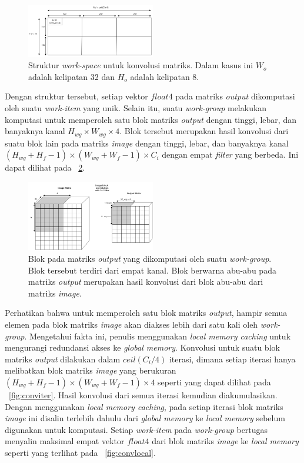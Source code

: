 \begin{figure}
	\centering
	\includegraphics[width=0.50\textwidth]
	{pics/wiconv.png}
	\caption{Struktur \textit{work-space} untuk konvolusi matriks. Dalam kasus ini $W_o$ adalah kelipatan 32 dan $H_o$ adalah kelipatan 8.}
	\label{fig:wiconv}
\end{figure}

Dengan struktur tersebut, setiap vektor $float4$ pada matriks \textit{output} dikomputasi oleh suatu \textit{work-item} yang unik. Selain itu, suatu \textit{work-group} melakukan komputasi untuk memperoleh satu blok matriks \textit{output} dengan tinggi, lebar, dan banyaknya kanal $H_{wg} \times W_{wg} \times 4$. Blok tersebut merupakan hasil konvolusi dari suatu blok lain pada matriks \textit{image} dengan tinggi, lebar, dan banyaknya kanal $(H_{wg}+H_f-1) \times (W_{wg}+W_f-1) \times C_i$ dengan empat \textit{filter} yang berbeda. Ini dapat dilihat pada \pic~\ref{fig:convblock}.   

\begin{figure}
	\centering
	\includegraphics[width=0.50\textwidth]
	{pics/convblock.png}
	\caption{Blok pada matriks \textit{output} yang dikomputasi oleh suatu \textit{work-group}. Blok tersebut terdiri dari empat kanal. Blok berwarna abu-abu pada matriks \textit{output} merupakan hasil konvolusi dari blok abu-abu dari matriks \textit{image}.}
	\label{fig:convblock}
\end{figure}

Perhatikan bahwa untuk memperoleh satu blok matriks \textit{output}, hampir semua elemen pada blok matriks \textit{image} akan diakses lebih dari satu kali oleh \textit{work-group}. Mengetahui fakta ini, penulis menggunakan \textit{local memory caching} untuk mengurangi redundansi akses ke \textit{global memory}. Konvolusi untuk suatu blok matriks \textit{output} dilakukan dalam $ceil(C_i/4)$ iterasi, dimana setiap iterasi hanya melibatkan blok matriks \textit{image} yang berukuran $(H_{wg}+H_f-1) \times (W_{wg}+W_f-1) \times 4$ seperti yang dapat dilihat pada \pic~\ref{fig:conviter}. Hasil konvolusi dari semua iterasi kemudian diakumulasikan. Dengan menggunakan \textit{local memory caching}, pada setiap iterasi blok matriks \textit{image} ini disalin terlebih dahulu dari \textit{global memory} ke \textit{local memory} sebelum digunakan untuk komputasi. Setiap \textit{work-item} pada \textit{work-group} bertugas menyalin maksimal empat vektor $float4$ dari blok matriks \textit{image} ke \textit{local memory} seperti yang terlihat pada \pic~\ref{fig:convlocal}.  

